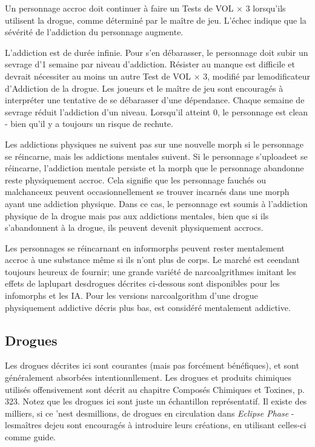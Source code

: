 Un personnage accroc doit continuer à faire un Tests de VOL $\times$ 3 lorsqu'ils utilisent la drogue, comme déterminé par le maître de jeu. L'échec indique que la sévérité de l'addiction du personnage augmente. 

L'addiction est de durée infinie. Pour s'en débarasser, le personnage doit subir un sevrage d'1 semaine par niveau d'addiction. Résister au manque est difficile et devrait nécessiter au moins un autre Test de VOL $\times$ 3, modifié par lemodificateur d'Addiction de la drogue. Les joueurs et le maître de jeu sont encouragés à interpréter une tentative de se débarasser d'une dépendance. Chaque semaine de sevrage réduit l'addiction d'un niveau. Lorsqu'il atteint 0, le personnage est clean - bien qu'il y a toujours un risque de rechute. 

Les addictions physiques ne suivent pas sur une nouvelle morph si le personnage se réincarne, mais les addictions mentales suivent. Si le personnage s'uploadeet se réincarne, l'addiction mentale persiste et la morph que le personnage abandonne reste physiquement accroc. Cela signifie que les personnage fauchés ou malchanceux peuvent occasionnellement se trouver incarnés dans une morph ayant une addiction physique. Dans ce cas, le personnage est soumis à l'addiction physique de la drogue mais pas aux addictions mentales, bien que si ils s'abandonnent à la drogue, ils peuvent devenit physiquement accrocs. 

Les personnages se réincarnant en informorphs peuvent rester mentalement accroc à une substance même si ils n'ont plus de corps. Le marché est ceendant toujours heureux de fournir; une grande variété de narcoalgrithmes imitant les effets de laplupart desdrogues décrites ci-dessous sont disponibles pour les infomorphs et les IA. Pour les versions narcoalgorithm d'une drogue physiquement addictive décris plus bas, est considéré mentalement addictive.

\subsection{Drogues} \label{sec:drugs} 

Les drogues décrites ici sont courantes (mais pas forcément bénéfiques), et sont généralement absorbées intentionnllement. Les drogues et produits chimiques utilisés offensivement sont décrit au chapitre Composés Chimiques et Toxines, p. 323. Notez que les drogues ici sont juste un échantillon représentatif. Il existe des milliers, si ce 'nest desmillions, de drogues en circulation dans \emph{Eclipse Phase} - lesmaîtres dejeu sont encouragés à introduire leurs créations, en utilisant celles-ci comme guide. 

